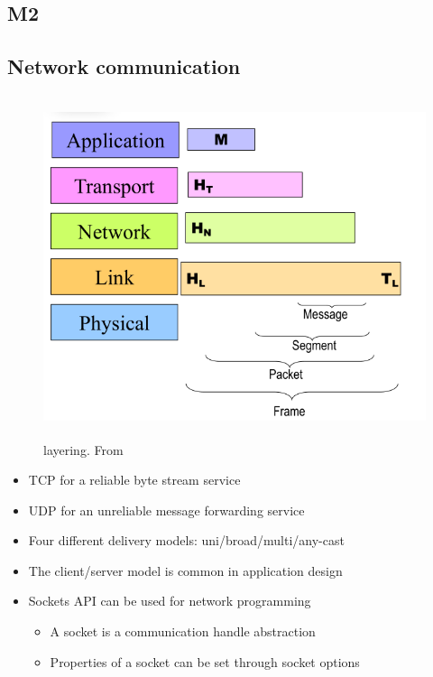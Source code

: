 \begin{multicols}{2}
\section{M2}
\subsection{Network communication}
\begin{figure}[h]
    \vspace{10mm}
    \centering
    \includegraphics[width=14cm, height=10cm]{image/layering.png}
    \caption{layering. From \cite{}}
\end{figure}

\begin{itemize}
\item TCP for a reliable byte stream service
\item UDP for an unreliable message forwarding service
\item Four different delivery models: uni/broad/multi/any-cast
\item The client/server model is common in application design
\item Sockets API can be used for network programming
  \begin{itemize}
  \item A socket is a communication handle abstraction
  \item Properties of a socket can be set through socket options
  \end{itemize}
\end{itemize}


\end{multicols}
